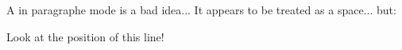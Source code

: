 \documentclass{basic}
\begin{document}

     \vspace*{1cm}

     \hspace{2cm}

     \vspace{1cm}

     A  in paragraphe mode \vspace{6cm} is a bad idea... It appears to be treated as a space... but:

     Look at the position of this line!
\end{document}
